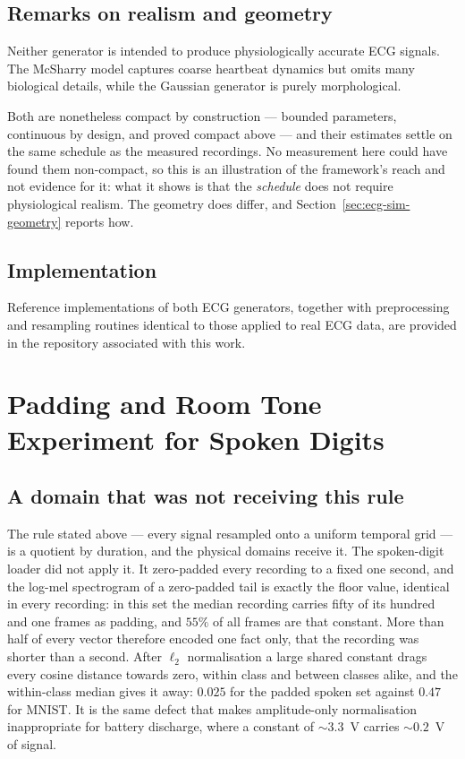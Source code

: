 \documentclass[10pt]{article}
\theoremstyle{plain}
\theoremstyle{definition}
\theoremstyle{remark}
\begin{document}
\subsection{Remarks on realism and geometry}

Neither generator is intended to produce physiologically accurate ECG signals.
The McSharry model captures coarse heartbeat dynamics but omits many biological
details, while the Gaussian generator is purely morphological.

Both are nonetheless compact by construction --- bounded parameters, continuous
by design, and proved compact above --- and their estimates settle on the same
schedule as the measured recordings. No measurement here could have found them
non-compact, so this is an illustration of the framework's reach and not
evidence for it: what it shows is that the \emph{schedule} does not require
physiological realism. The geometry does differ, and
Section~\ref{sec:ecg-sim-geometry} reports how.

\subsection*{Implementation}

Reference implementations of both ECG generators, together with preprocessing
and resampling routines identical to those applied to real ECG data, are
provided in the repository associated with this work.



\section{Padding and Room Tone Experiment for Spoken Digits}\label{app:padding}
\subsection{A domain that was not receiving this rule}
\label{sec:spoken-duration}

The rule stated above --- every signal resampled onto a uniform temporal grid
--- is a quotient by duration, and the physical domains receive it. The
spoken-digit loader did not apply it. It zero-padded every recording to a fixed
one second, and the log-mel spectrogram of a zero-padded tail is exactly the
floor value, identical in every recording: in this set the median recording
carries fifty of its hundred and one frames as padding, and $55\%$ of all
frames are that constant. More than half of every vector therefore encoded one
fact only, that the recording was shorter than a second. After $\ell_2$
normalisation a large shared constant drags every cosine distance towards zero,
within class and between classes alike, and the within-class median gives it
away: $0.025$ for the padded spoken set against $0.47$ for MNIST. It is the
same defect that makes amplitude-only normalisation inappropriate for battery
discharge, where a constant of ${\sim}3.3$~V carries ${\sim}0.2$~V of signal.
\end{document}
